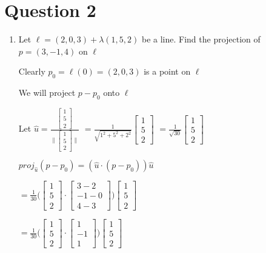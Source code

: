 \documentclass{article}
\begin{document}
    \section*{Question 2}

    \begin{enumerate}
        \item Let $\ell=(2,0,3)+ \lambda(1,5,2)$ be a line. Find the projection of $p=(3,-1,4)$ on $\ell$

        Clearly $p_0 = \ell(0) = (2,0,3)$ is a point on $\ell$ 

        We will project $p - p_0$ onto $\ell$

        Let $\hat{u} = \frac{\begin{bmatrix} 1 \\ 5 \\ 2\end{bmatrix}}
        { \Bigg \| \begin{bmatrix} 1 \\ 5 \\ 2\end{bmatrix} \Bigg \| }$
        $ = \frac{1}{ \sqrt{1^2 + 5^2 + 2^2} }  \begin{bmatrix} 1 \\ 5 \\ 2 \end{bmatrix}$
        $ = \frac{1}{ \sqrt{30} }\begin{bmatrix} 1 \\ 5 \\ 2\end{bmatrix}$

        $proj_{\hat{u}}(p - p_0)= (\hat{u} \cdot (p - p_0)) \hat{u} $

        $= \frac{1}{30} \Bigg (\begin{bmatrix} 1 \\ 5 \\ 2\end{bmatrix} \cdot \begin{bmatrix} 3 - 2 \\ -1 - 0 \\ 4 - 3 \end{bmatrix} \Bigg )\begin{bmatrix} 1 \\ 5 \\ 2\end{bmatrix}$

        $= \frac{1}{30} \Bigg (\begin{bmatrix} 1 \\ 5 \\ 2\end{bmatrix} \cdot \begin{bmatrix} 1 \\ -1 \\ 1 \end{bmatrix} \Bigg )\begin{bmatrix} 1 \\ 5 \\ 2\end{bmatrix}$


\end{enumerate}
\end{document}
